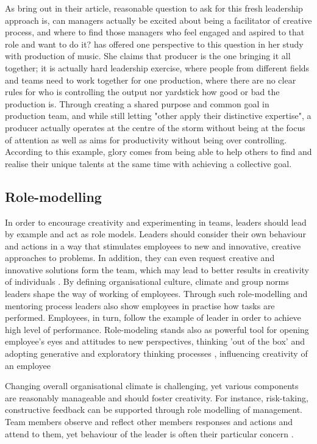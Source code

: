  As \citet{garvin2008yours} bring out in their article, reasonable question to ask for this fresh leadership approach is, can managers actually be excited about being a facilitator of creative process, and where to find those managers who feel engaged and aspired to that role and want to do it? \citet{lingo2010nexus} has offered one perspective to this question in her study with production of music. She claims that producer is the one bringing it all together; it is actually hard leadership exercise, where people from different fields and teams need to work together for one production, where there are no clear rules for who is controlling the output nor yardstick how good or bad the production is. Through creating a shared purpose and common goal in production team, and while still letting "other apply their distinctive expertise", a producer actually operates at the centre of the storm without being at the focus of attention as well as aims for productivity without being over controlling. According to this example, glory comes from being able to help others to find and realise their unique talents at the same time with achieving a collective goal. 
 
\subsection{Role-modelling}
In order to encourage creativity and experimenting in teams, leaders should lead by example and act as role models. Leaders should consider their own behaviour and actions in a way that stimulates employees to new and innovative, creative approaches to problems. In addition, they can even request creative and innovative solutions form the team, which may lead to better results in creativity of individuals \citep{amabile2002creativity}. \citep{mumford2002leading,amabile2008creativity,waldman1990adding}
By defining organisational culture, climate and group norms leaders shape the way of working of employees. Through such role-modelling and mentoring process leaders also show employees in practise how tasks are performed. Employees, in turn, follow the example of leader in order to achieve high level of performance. \citep{redmond1993putting} Role-modeling stands also as powerful tool for opening employee's eyes and attitudes to new perspectives, thinking 'out of the box' and adopting generative and exploratory thinking processes \citep{jung2003role,sternberg1997creativity}, influencing creativity of an employee \citep{shalley2004leaders}

Changing overall organisational climate is challenging, yet various components are reasonably manageable and should foster creativity. For instance, risk-taking, constructive feedback can be supported through role modelling of management. \citep{shalley2004leaders} Team members observe and reflect other members responses and actions and attend to them, yet behaviour of the leader is often their particular concern \citep{tyler1992relational}.


